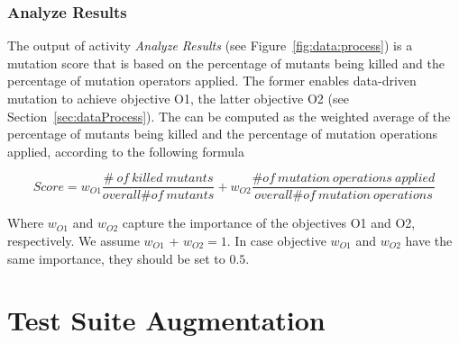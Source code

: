 
\subsubsection{Analyze Results}
\label{sec:analyzeResults}

The output  of activity \emph{Analyze Results} (see Figure~\ref{fig:data:process}) is a mutation score that is based on
the percentage of mutants being killed and the percentage of mutation operators applied. 
The former enables data-driven mutation to achieve objective O1, the latter objective O2 (see Section~\ref{sec:dataProcess}). 
The  can be computed as the weighted average of the percentage of mutants being killed and the percentage of mutation operations applied, according to the following formula

\begin{equation}
Score=w_{O1} \frac{\# \ \mathit{of}\ \mathit{killed} \ \mathit{mutants}}{\mathit{overall} \# \mathit{of}\ \mathit{mutants}} + w_{O2} \frac{\# \mathit{of}\ \mathit{mutation} \ \mathit{operations} \ \mathit{applied}}{\mathit{overall} \# \mathit{of}\ \mathit{mutation} \ \mathit{operations}}
\label{f:mutation:score}
\end{equation}

Where $w_{O1}$ and $w_{O2}$ capture the importance of the objectives O1 and O2, respectively. We assume $w_{O1}$ + $w_{O2} = 1$. In case objective $w_{O1}$ and $w_{O2}$ have the same importance, they should be set to $0.5$. 










\clearpage
\section{Test Suite Augmentation} %
\label{sec:data:test_suite_augmentation}


